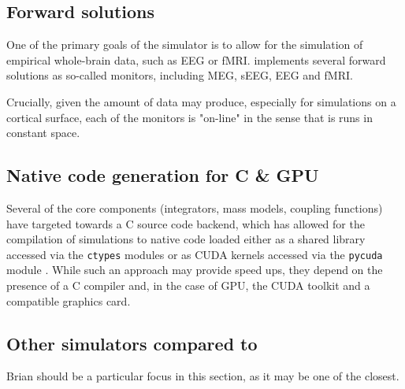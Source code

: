 \subsection{Forward solutions}

	One of the primary goals of the \TVB simulator is to allow for the
	simulation of empirical whole-brain data, such as EEG or fMRI.
	\TVB implements several forward solutions as so-called monitors, 
	including MEG, sEEG, EEG and fMRI. 

	Crucially, given the amount of data \TVB may produce, especially for
	simulations on a cortical surface, each of the monitors is "on-line"
	in the sense that is runs in constant space.

\subsection{Native code generation for C \& GPU}

	Several of the core components (integrators, mass models, coupling
	functions) have targeted towards a C source code backend, which has
	allowed for the compilation of simulations to native code loaded 
	either as a shared library accessed via the \texttt{ctypes} modules
	or as CUDA kernels accessed via the \texttt{pycuda} module \cite{pycuda}.
	While such an approach may provide speed ups, they depend on the
	presence of a C compiler and, in the case of GPU, the CUDA toolkit and
	a compatible graphics card. 


\subsection{Other simulators compared to \TVB}

	Brian should be a particular focus in this section, as it may
	be one of the closest. 

